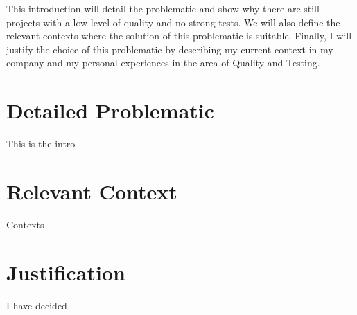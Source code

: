 This introduction will detail the problematic and show why there are
still projects with a low level of quality and no strong tests.
We will also define the relevant contexts where the solution of this
problematic is suitable.
Finally, I will justify the choice of this problematic by describing my
current context in my company and my personal experiences in the area of
Quality and Testing.
\section{Detailed Problematic}\label{sec:detailed-problematic}
This is the intro
\section{Relevant Context}\label{sec:relevant-context}
Contexts
\section{Justification}\label{sec:justification}
I have decided